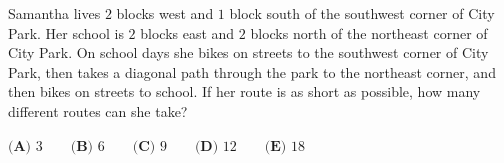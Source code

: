Samantha lives $2$ blocks west and $1$ block south of the southwest corner of City Park. Her school is $2$ blocks east and $2$ blocks north of the northeast corner of City Park. On school days she bikes on streets to the southwest corner of City Park, then takes a diagonal path through the park to the northeast corner, and then bikes on streets to school. If her route is as short as possible, how many different routes can she take?

$\textbf{(A) }3\qquad\textbf{(B) }6\qquad\textbf{(C) }9\qquad\textbf{(D) }12\qquad\textbf{(E) }18$
